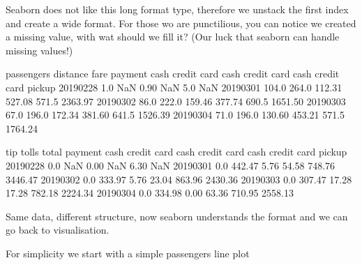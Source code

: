 \documentclass[letterpaper,10pt,english]{jupyterBook}
\begin{document}
\sphinxAtStartPar
Seaborn does not like this long format type, therefore we unstack the first index and create a wide format.
For those wo are punctilious, you can notice we created a missing value, with wat should we fill it? (Our luck that seaborn can handle missing values!)

\begin{sphinxVerbatim}[commandchars=\\\{\}]
\end{sphinxVerbatim}

\begin{sphinxVerbatim}[commandchars=\\\{\}]
           passengers             distance               fare              \PYGZbs{}
payment          cash credit card     cash credit card   cash credit card   
pickup                                                                      
2019\PYGZhy{}02\PYGZhy{}28        1.0         NaN     0.90         NaN    5.0         NaN   
2019\PYGZhy{}03\PYGZhy{}01      104.0       264.0   112.31      527.08  571.5     2363.97   
2019\PYGZhy{}03\PYGZhy{}02       86.0       222.0   159.46      377.74  690.5     1651.50   
2019\PYGZhy{}03\PYGZhy{}03       67.0       196.0   172.34      381.60  641.5     1526.39   
2019\PYGZhy{}03\PYGZhy{}04       71.0       196.0   130.60      453.21  571.5     1764.24   

            tip              tolls               total              
payment    cash credit card   cash credit card    cash credit card  
pickup                                                              
2019\PYGZhy{}02\PYGZhy{}28  0.0         NaN   0.00         NaN    6.30         NaN  
2019\PYGZhy{}03\PYGZhy{}01  0.0      442.47   5.76       54.58  748.76     3446.47  
2019\PYGZhy{}03\PYGZhy{}02  0.0      333.97   5.76       23.04  863.96     2430.36  
2019\PYGZhy{}03\PYGZhy{}03  0.0      307.47  17.28       17.28  782.18     2224.34  
2019\PYGZhy{}03\PYGZhy{}04  0.0      334.98   0.00       63.36  710.95     2558.13  
\end{sphinxVerbatim}

\sphinxAtStartPar
Same data, different structure, now seaborn understands the format and we can go back to visualisation.

\sphinxAtStartPar
For simplicity we start with a simple passengers line plot

\begin{sphinxVerbatim}[commandchars=\\\{\}]
  \PYG{p}{[}\PYG{p}{]}
\end{sphinxVerbatim}
\end{document}
